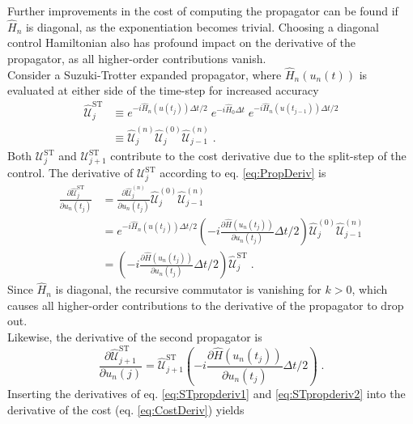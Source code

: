 Further improvements in the cost of computing the propagator can be found if $\hat{H}_n$ is diagonal, as the exponentiation becomes trivial. Choosing a diagonal control Hamiltonian also has profound impact on the  derivative of the propagator, as all higher-order contributions vanish.\\
Consider a Suzuki-Trotter expanded propagator, where $\hat{H}_n (u_n (t))$ is evaluated at either side of the time-step for increased accuracy
\begin{align}
	\hat{\mathcal{U}}_{j}^{\mathrm{ST}} &\equiv e^{ -i  \hat{H}_n (u (t_j)) \Delta t /2 } \; e^{ -i \hat{H}_0 \Delta t } \; e^{ -i  \hat{H}_n (u (t_{j-1}))  \Delta t /2 } \\
	& \equiv \hat{\mathcal{U}}_{j}^{(n)} \hat{\mathcal{U}}_{j}^{(0)} \hat{\mathcal{U}}_{j-1}^{(n)} \; .
\end{align}
Both $\mathcal{U}_{j}^{\mathrm{ST}}$ and $\mathcal{U}_{j+1}^{\mathrm{ST}}$ contribute to the cost derivative due to the split-step of the control.
The derivative of $\mathcal{U}_{j}^{\mathrm{ST}}$ according to eq. \eqref{eq:PropDeriv} is
\begin{align}
	\frac{\partial \hat{\mathcal{U}}_{j}^{\mathrm{ST}}}{\partial u_n (t_j)} &=  \frac{\partial \hat{\mathcal{U}}_{j}^{(n)}}{\partial u_n (t_j)} \hat{\mathcal{U}}_{j}^{(0)} \hat{\mathcal{U}}_{j-1}^{(n)} \nonumber \\
	&= e^{ -i  \hat{H}_n (u (t_j)) \Delta t /2 } \left( -i \frac{\partial \hat{H} (u_n (t_j))}{\partial u_n (t_j)} \Delta t /2 \right) \hat{\mathcal{U}}_{j}^{(0)} \hat{\mathcal{U}}_{j-1}^{(n)} \nonumber \\
	&= \left( -i \frac{\partial \hat{H} (u_n (t_j))}{\partial u_n (t_j)} \Delta t /2 \right) \hat{\mathcal{U}}_{j}^{\mathrm{ST}} \; . \label{eq:STpropderiv1}
\end{align}
Since $\hat{H}_n$ is diagonal, the recursive commutator is vanishing for $k > 0$, which causes all higher-order contributions to the derivative of the propagator to drop out.\\
Likewise, the derivative of the second propagator is
\begin{equation}
	\frac{\partial \hat{\mathcal{U}}_{j+1}^{\mathrm{ST}}}{\partial u_n (j)} =  \hat{\mathcal{U}}_{j+1}^{\mathrm{ST}} \left( -i \frac{\partial \hat{H} (u_n (t_j))}{\partial u_n (t_j)} \Delta t /2 \right) \; . \label{eq:STpropderiv2}
\end{equation}
Inserting the derivatives of eq. \eqref{eq:STpropderiv1} and \eqref{eq:STpropderiv2} into the derivative of the cost (eq. \eqref{eq:CostDeriv}) yields
